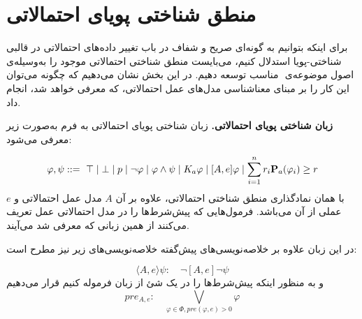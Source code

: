\section{منطق شناختی پویای احتمالاتی\texorpdfstring{ }{(PDEL)}}
برای اینکه بتوانیم به گونه‌ای صریح و شفاف در باب تغییر داده‌های احتمالاتی در قالبی شناختی-پویا استدلال کنیم، می‌بایست منطق شناختی احتمالاتی موجود را به‌وسیله‌ی اصول موضوعه‌ی {\reduction}‌ مناسب توسعه دهیم. در این بخش نشان می‌دهیم که چگونه می‌توان این کار را بر مبنای معناشناسی مدل‌های عمل احتمالاتی، که معرفی خواهد شد، انجام داد.
\begin{definition}\textbf{زبان شناختی پویای احتمالاتی.}
زبان شناختی پویای احتمالاتی به فرم  به‌صورت زیر معرفی می‌شود:

\begin{equation*}
\varphi,\psi ::=\ \top\mid\bot\mid p\mid \neg\varphi\mid\varphi\land\psi\mid K_a\varphi\mid [A,e]\varphi\mid\sum_{i=1}^n r_i \mathbf{P}_a(\varphi_i)\geq r
\end{equation*}
با همان نمادگذاری منطق شناختی احتمالاتی، علاوه بر آن $ A $ مدل عمل احتمالاتی و $ e $ عملی از آن می‌باشد. فرمول‌هایی که پیش‌شرط‌ها را در مدل احتمالاتی عمل تعریف می‌کنند از همین زبانی که معرفی شد می‌آیند.

در این زبان علاوه بر خلاصه‌نویسی‌های پیش‌گفته خلاصه‌نویسی‌های زیر نیز مطرح است:

$$\langle A,e \rangle\psi :\quad \neg[A,e]\neg\psi$$
و به منظور اینکه پیش‌شرط‌ها را در یک شئ از زبان فرموله کنیم قرار می‌دهیم
\begin{equation}\label{pg0}
pre_{A,e} :\quad\bigvee_{\varphi\in\Phi,pre(\varphi,e)>0}\varphi
\end{equation}
\end{definition}
